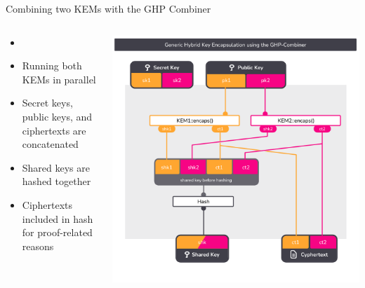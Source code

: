 \begin{frame}{Combining two KEMs with the GHP Combiner}
  \begin{columns}[c]
    \begin{column}{.4\linewidth}
      \small
      \begin{itemize}
        \item {} \citeGhp
        \item Running both KEMs in parallel
        \item Secret keys, public keys, and ciphertexts are concatenated
        \item Shared keys are hashed together
        \item Ciphertexts included in hash for proof-related reasons
      \end{itemize}
    \end{column}

    \begin{column}{.6\linewidth}
      \includegraphics[height=.92\textheight,page=1,clip=true,trim={0.5cm 1cm 0.7cm 1.5cm}]{graphics/rosenpass-encapsulation-combiner.pdf}
    \end{column}

  \end{columns}
\end{frame}

